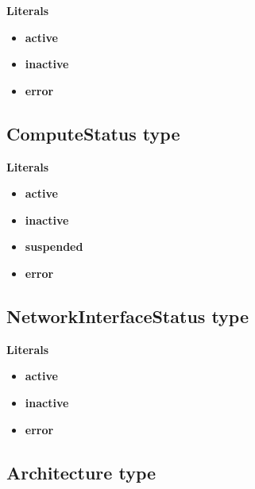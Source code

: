\documentclass{article}
\begin{document}
\textbf{Literals}
\begin{itemize}
\item \textbf{active} 
\end{itemize}
\begin{itemize}
\item \textbf{inactive} 
\end{itemize}
\begin{itemize}
\item \textbf{error} 
\end{itemize}

\subsection{ComputeStatus type}

\textbf{Literals}
\begin{itemize}
\item \textbf{active} 
\end{itemize}
\begin{itemize}
\item \textbf{inactive} 
\end{itemize}
\begin{itemize}
\item \textbf{suspended} 
\end{itemize}
\begin{itemize}
\item \textbf{error} 
\end{itemize}

\subsection{NetworkInterfaceStatus type}

\textbf{Literals}
\begin{itemize}
\item \textbf{active} 
\end{itemize}
\begin{itemize}
\item \textbf{inactive} 
\end{itemize}
\begin{itemize}
\item \textbf{error} 
\end{itemize}

\subsection{Architecture type}
\end{document}
